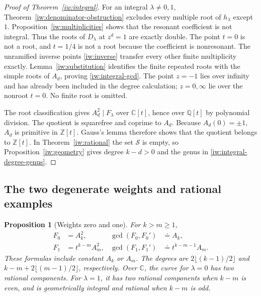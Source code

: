 \documentclass[11pt,a4paper]{article}
\newtheorem{proposition}[theorem]{Proposition}
\theoremstyle{definition}
\theoremstyle{remark}
\begin{document}
\begin{proof}[Proof of Theorem~\ref{iw:integral}]
For an integral \(\lambda\ne0,1\),
Theorem~\ref{iw:denominator-obstruction} excludes every
multiple root of \(h_\lambda\) except \(1\).
Proposition~\ref{iw:multiplicities} shows that the resonant
coefficient is not integral. Thus the roots of \(D_\lambda\)
at \(z^d=1\) are exactly double. The point \(t=0\) is not a
root, and \(t=1/4\) is not a root because the coefficient
is nonresonant. The unramified inverse points
\eqref{iw:inverse} transfer every other finite multiplicity
exactly. Lemma~\ref{iw:substitution} identifies the finite
repeated roots with the simple roots of \(A_d\), proving
\eqref{iw:integral-gcd}. The point \(z=-1\) lies over
infinity and has already been included in the degree
calculation; \(z=0,\infty\) lie over the nonroot \(t=0\).
No finite root is omitted.

The root classification gives \(A_d^2\mid F_\lambda\)
over \(\mathbb C[t]\), hence over \(\mathbb Q[t]\) by
polynomial division. The quotient is squarefree and
coprime to \(A_d\). Because \(A_d(0)=\pm1\), \(A_d\) is
primitive in \(\mathbb Z[t]\). Gauss's lemma therefore
shows that the quotient belongs to \(\mathbb Z[t]\).
In Theorem~\ref{iw:rational} the set \(\mathcal S\) is
empty, so Proposition~\ref{iw:geometry} gives degree
\(k-d>0\) and the genus in \eqref{iw:integral-degree-genus}.
\end{proof}

\subsection{The two degenerate weights and rational examples}

\begin{proposition}[Weights zero and one]\label{iw:degenerate}
For \(k>m\ge1\),
\begin{align}
 F_0&=A_k^2,&
 \gcd(F_0,F_0')&\doteq A_k,\label{iw:lambda-zero}\\
 F_1&=t^{k-m}A_m^2,&
 \gcd(F_1,F_1')&\doteq t^{k-m-1}A_m.\label{iw:lambda-one}
\end{align}
These formulas include constant \(A_k\) or \(A_m\).
The degrees are \(2\lfloor(k-1)/2\rfloor\) and
\(k-m+2\lfloor(m-1)/2\rfloor\), respectively.
Over \(\mathbb C\), the curve for \(\lambda=0\) has two
rational components. For \(\lambda=1\), it has two rational
components when \(k-m\) is even, and is geometrically
integral and rational when \(k-m\) is odd.
\end{proposition}
\end{document}
